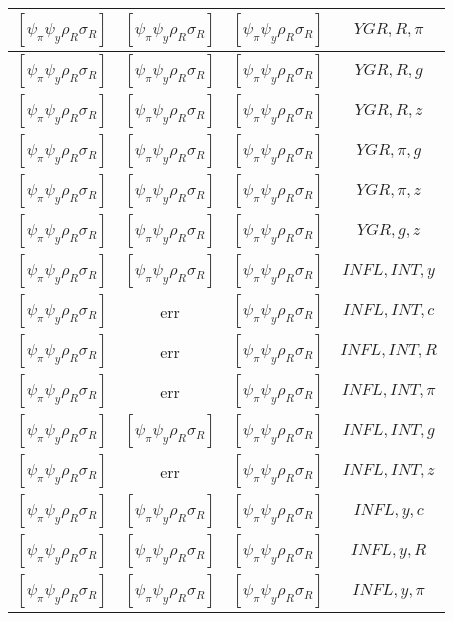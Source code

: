 \documentclass[a4paper,10pt]{article}
\begin{document}
\begin{longtable}{|c|c|c|c|}
\hline
$[\psi_\pi \psi_y \rho_R \sigma_R ]$ & $[\psi_\pi \psi_y \rho_R \sigma_R ]$ & $[\psi_\pi \psi_y \rho_R \sigma_R ]$ & ${YGR},{R},{\pi}$ \\
\hline
$[\psi_\pi \psi_y \rho_R \sigma_R ]$ & $[\psi_\pi \psi_y \rho_R \sigma_R ]$ & $[\psi_\pi \psi_y \rho_R \sigma_R ]$ & ${YGR},{R},{g}$ \\
\hline
$[\psi_\pi \psi_y \rho_R \sigma_R ]$ & $[\psi_\pi \psi_y \rho_R \sigma_R ]$ & $[\psi_\pi \psi_y \rho_R \sigma_R ]$ & ${YGR},{R},{z}$ \\
\hline
$[\psi_\pi \psi_y \rho_R \sigma_R ]$ & $[\psi_\pi \psi_y \rho_R \sigma_R ]$ & $[\psi_\pi \psi_y \rho_R \sigma_R ]$ & ${YGR},{\pi},{g}$ \\
\hline
$[\psi_\pi \psi_y \rho_R \sigma_R ]$ & $[\psi_\pi \psi_y \rho_R \sigma_R ]$ & $[\psi_\pi \psi_y \rho_R \sigma_R ]$ & ${YGR},{\pi},{z}$ \\
\hline
$[\psi_\pi \psi_y \rho_R \sigma_R ]$ & $[\psi_\pi \psi_y \rho_R \sigma_R ]$ & $[\psi_\pi \psi_y \rho_R \sigma_R ]$ & ${YGR},{g},{z}$ \\
\hline
$[\psi_\pi \psi_y \rho_R \sigma_R ]$ & $[\psi_\pi \psi_y \rho_R \sigma_R ]$ & $[\psi_\pi \psi_y \rho_R \sigma_R ]$ & ${INFL},{INT},{y}$ \\
\hline
$[\psi_\pi \psi_y \rho_R \sigma_R ]$ & err & $[\psi_\pi \psi_y \rho_R \sigma_R ]$ & ${INFL},{INT},{c}$ \\
\hline
$[\psi_\pi \psi_y \rho_R \sigma_R ]$ & err & $[\psi_\pi \psi_y \rho_R \sigma_R ]$ & ${INFL},{INT},{R}$ \\
\hline
$[\psi_\pi \psi_y \rho_R \sigma_R ]$ & err & $[\psi_\pi \psi_y \rho_R \sigma_R ]$ & ${INFL},{INT},{\pi}$ \\
\hline
$[\psi_\pi \psi_y \rho_R \sigma_R ]$ & $[\psi_\pi \psi_y \rho_R \sigma_R ]$ & $[\psi_\pi \psi_y \rho_R \sigma_R ]$ & ${INFL},{INT},{g}$ \\
\hline
$[\psi_\pi \psi_y \rho_R \sigma_R ]$ & err & $[\psi_\pi \psi_y \rho_R \sigma_R ]$ & ${INFL},{INT},{z}$ \\
\hline
$[\psi_\pi \psi_y \rho_R \sigma_R ]$ & $[\psi_\pi \psi_y \rho_R \sigma_R ]$ & $[\psi_\pi \psi_y \rho_R \sigma_R ]$ & ${INFL},{y},{c}$ \\
\hline
$[\psi_\pi \psi_y \rho_R \sigma_R ]$ & $[\psi_\pi \psi_y \rho_R \sigma_R ]$ & $[\psi_\pi \psi_y \rho_R \sigma_R ]$ & ${INFL},{y},{R}$ \\
\hline
$[\psi_\pi \psi_y \rho_R \sigma_R ]$ & $[\psi_\pi \psi_y \rho_R \sigma_R ]$ & $[\psi_\pi \psi_y \rho_R \sigma_R ]$ & ${INFL},{y},{\pi}$ \\

\end{longtable}
\end{document}
